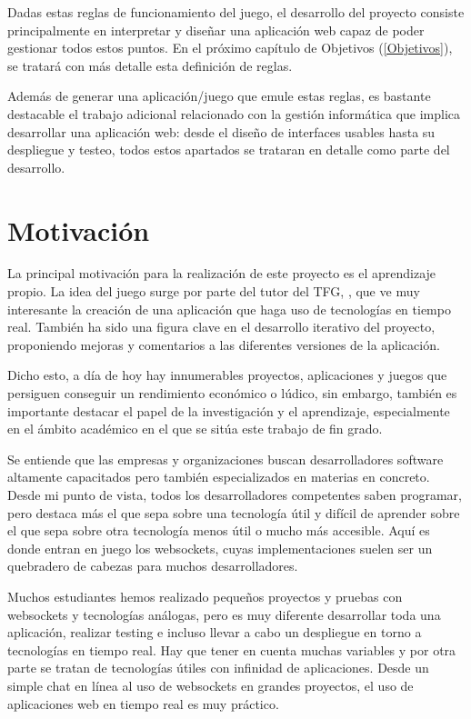 Dadas estas reglas de funcionamiento del juego, el desarrollo del proyecto consiste principalmente en
interpretar y diseñar una aplicación web capaz de poder gestionar todos estos puntos. En el próximo capítulo de Objetivos (\ref{Objetivos}),
se tratará con más detalle esta definición de reglas.

Además de generar una aplicación/juego que emule estas reglas, es bastante destacable el trabajo adicional relacionado con la gestión informática que
implica desarrollar una aplicación web: desde el diseño de interfaces usables hasta su despliegue y testeo, todos estos apartados se trataran en detalle
como parte del desarrollo.

\section{Motivación}

La principal motivación para la realización de este proyecto es el aprendizaje propio. La idea del juego
surge por parte del tutor del TFG, \nombretutor, que ve muy interesante la creación de una aplicación que haga uso de tecnologías en
tiempo real. También ha sido una figura clave en el desarrollo iterativo del proyecto, proponiendo mejoras y comentarios
a las diferentes versiones de la aplicación.

Dicho esto, a día de hoy hay innumerables proyectos, aplicaciones y juegos que persiguen conseguir un rendimiento económico o lúdico, sin embargo, también es importante destacar el papel
de la investigación y el aprendizaje, especialmente en el ámbito académico en el que se sitúa este trabajo de fin grado.

Se entiende que las empresas y organizaciones buscan desarrolladores software altamente capacitados pero también especializados en materias en concreto. Desde mi punto de vista,
todos los desarrolladores competentes saben programar, pero destaca más el que sepa sobre una tecnología útil y difícil de aprender sobre el que sepa
sobre otra tecnología menos útil o mucho más accesible. Aquí es donde entran en juego los websockets, cuyas implementaciones suelen ser un quebradero
de cabezas para muchos desarrolladores.

Muchos estudiantes hemos realizado pequeños proyectos y pruebas con websockets y tecnologías análogas, pero es muy diferente desarrollar toda una aplicación, realizar testing e
incluso llevar a cabo un despliegue en torno a tecnologías en tiempo real. Hay que tener en cuenta muchas variables y por otra parte se tratan de tecnologías útiles
con infinidad de aplicaciones. Desde un simple chat en línea al uso de websockets en grandes proyectos, el uso de aplicaciones web en tiempo real es muy práctico.

